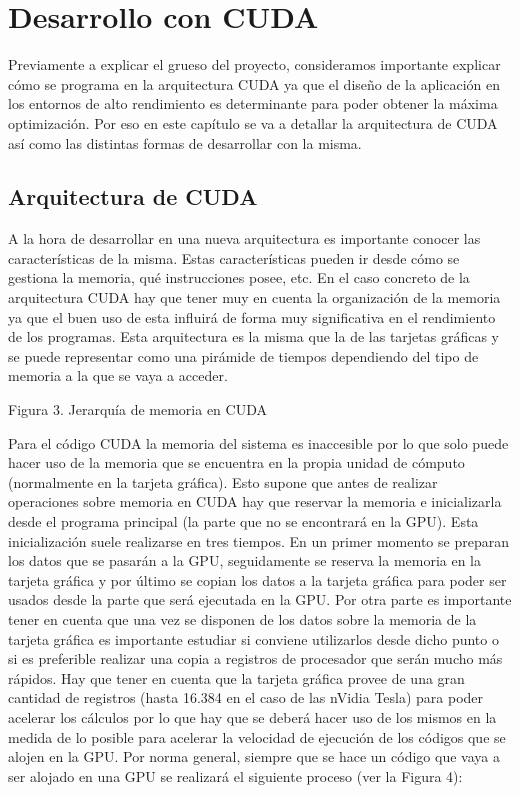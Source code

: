 \chapter{Desarrollo con CUDA}

Previamente a explicar el grueso del proyecto, consideramos importante explicar cómo se programa en la arquitectura CUDA ya que el diseño de la aplicación en los entornos de alto rendimiento es determinante para poder obtener la máxima optimización. Por eso en este capítulo se va a detallar la arquitectura de CUDA así como las distintas formas de desarrollar con la misma.

\section{Arquitectura de CUDA}
A la hora de desarrollar en una nueva arquitectura es importante conocer las características de la misma. Estas características pueden ir desde cómo se gestiona la memoria, qué instrucciones posee, etc.
En el caso concreto de la arquitectura CUDA hay que tener muy en cuenta la organización de la memoria ya que el buen uso de esta influirá de forma muy significativa en el rendimiento de los programas. Esta arquitectura es la misma que la de las tarjetas gráficas y se puede representar como una pirámide de tiempos dependiendo del tipo de memoria a la que se vaya a acceder.
 
Figura 3. Jerarquía de memoria en CUDA

Para el código CUDA la memoria del sistema es inaccesible por lo que solo puede hacer uso de la memoria que se encuentra en la propia unidad de cómputo (normalmente en la tarjeta gráfica). Esto supone que antes de realizar operaciones sobre memoria en CUDA hay que reservar la memoria e inicializarla desde el programa principal (la parte que no se encontrará en la GPU). Esta inicialización suele realizarse en tres tiempos. En un primer momento se preparan los datos que se pasarán a la GPU, seguidamente se reserva la memoria en la tarjeta gráfica y por último se copian los datos a la tarjeta gráfica para poder ser usados desde la parte que será ejecutada en la GPU.
Por otra parte es importante tener en cuenta que una vez se disponen de los datos sobre la memoria de la tarjeta gráfica es importante estudiar si conviene utilizarlos desde dicho punto o si es preferible realizar una copia a registros de procesador que serán mucho más rápidos. Hay que tener en cuenta que la tarjeta gráfica provee de una gran cantidad de registros (hasta 16.384 en el caso de las nVidia Tesla) para poder acelerar los cálculos por lo que hay que se deberá hacer uso de los mismos en la medida de lo posible para acelerar la velocidad de ejecución de los códigos que se alojen en la GPU.
Por norma general, siempre que se hace un código que vaya a ser alojado en una GPU se realizará el siguiente proceso (ver la Figura 4):

